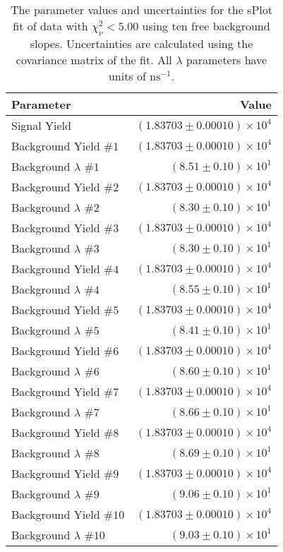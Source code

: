 
\begin{table}[ht]
    \begin{center}
        \begin{tabular}{lr}\toprule
            Parameter & Value \\\midrule
            Signal Yield & $(1.83703 \pm 0.00010) \times 10^{4}$ \\
            Background Yield $\#1$ & $(1.83703 \pm 0.00010) \times 10^{4}$ \\
            Background $\lambda$ $\#1$ & $(8.51 \pm 0.10) \times 10^{1}$ \\
            Background Yield $\#2$ & $(1.83703 \pm 0.00010) \times 10^{4}$ \\
            Background $\lambda$ $\#2$ & $(8.30 \pm 0.10) \times 10^{1}$ \\
            Background Yield $\#3$ & $(1.83703 \pm 0.00010) \times 10^{4}$ \\
            Background $\lambda$ $\#3$ & $(8.30 \pm 0.10) \times 10^{1}$ \\
            Background Yield $\#4$ & $(1.83703 \pm 0.00010) \times 10^{4}$ \\
            Background $\lambda$ $\#4$ & $(8.55 \pm 0.10) \times 10^{1}$ \\
            Background Yield $\#5$ & $(1.83703 \pm 0.00010) \times 10^{4}$ \\
            Background $\lambda$ $\#5$ & $(8.41 \pm 0.10) \times 10^{1}$ \\
            Background Yield $\#6$ & $(1.83703 \pm 0.00010) \times 10^{4}$ \\
            Background $\lambda$ $\#6$ & $(8.60 \pm 0.10) \times 10^{1}$ \\
            Background Yield $\#7$ & $(1.83703 \pm 0.00010) \times 10^{4}$ \\
            Background $\lambda$ $\#7$ & $(8.66 \pm 0.10) \times 10^{1}$ \\
            Background Yield $\#8$ & $(1.83703 \pm 0.00010) \times 10^{4}$ \\
            Background $\lambda$ $\#8$ & $(8.69 \pm 0.10) \times 10^{1}$ \\
            Background Yield $\#9$ & $(1.83703 \pm 0.00010) \times 10^{4}$ \\
            Background $\lambda$ $\#9$ & $(9.06 \pm 0.10) \times 10^{1}$ \\
            Background Yield $\#10$ & $(1.83703 \pm 0.00010) \times 10^{4}$ \\
            Background $\lambda$ $\#10$ & $(9.03 \pm 0.10) \times 10^{1}$ \\\bottomrule
        \end{tabular}
        \caption{The parameter values and uncertainties for the sPlot fit of data with $\chi^2_\nu < 5.00$ using ten free background slopes. Uncertainties are calculated using the covariance matrix of the fit. All $\lambda$ parameters have units of $\si{\nano\second}^{-1}$.}\label{tab:splot-fit-results-chisqdof-5.00-free-10}
    \end{center}
\end{table}
